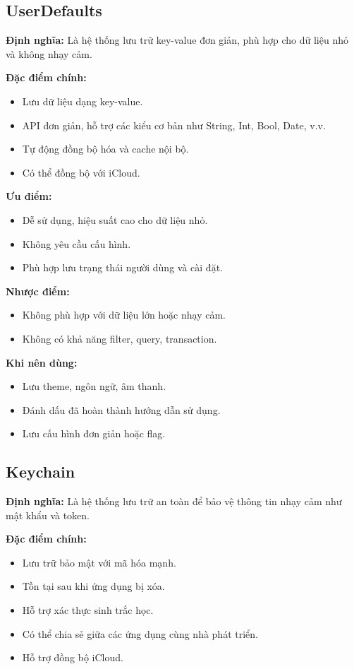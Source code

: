 \subsection{UserDefaults}

\textbf{Định nghĩa:} Là hệ thống lưu trữ key-value đơn giản, phù hợp cho dữ liệu nhỏ và không nhạy cảm.

\textbf{Đặc điểm chính:}
\begin{itemize}
    \item Lưu dữ liệu dạng key-value.
    \item API đơn giản, hỗ trợ các kiểu cơ bản như String, Int, Bool, Date, v.v.
    \item Tự động đồng bộ hóa và cache nội bộ.
    \item Có thể đồng bộ với iCloud.
\end{itemize}

\textbf{Ưu điểm:}
\begin{itemize}
    \item Dễ sử dụng, hiệu suất cao cho dữ liệu nhỏ.
    \item Không yêu cầu cấu hình.
    \item Phù hợp lưu trạng thái người dùng và cài đặt.
\end{itemize}

\textbf{Nhược điểm:}
\begin{itemize}
    \item Không phù hợp với dữ liệu lớn hoặc nhạy cảm.
    \item Không có khả năng filter, query, transaction.
\end{itemize}

\textbf{Khi nên dùng:}
\begin{itemize}
    \item Lưu theme, ngôn ngữ, âm thanh.
    \item Đánh dấu đã hoàn thành hướng dẫn sử dụng.
    \item Lưu cấu hình đơn giản hoặc flag.
\end{itemize}

\subsection{Keychain}

\textbf{Định nghĩa:} Là hệ thống lưu trữ an toàn để bảo vệ thông tin nhạy cảm như mật khẩu và token.

\textbf{Đặc điểm chính:}
\begin{itemize}
    \item Lưu trữ bảo mật với mã hóa mạnh.
    \item Tồn tại sau khi ứng dụng bị xóa.
    \item Hỗ trợ xác thực sinh trắc học.
    \item Có thể chia sẻ giữa các ứng dụng cùng nhà phát triển.
    \item Hỗ trợ đồng bộ iCloud.
\end{itemize}

